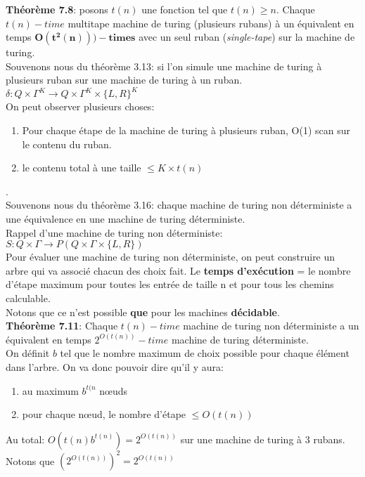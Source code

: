 \documentclass[a4paper,12pt]{article}
\begin{document}
  \textbf{Théorème 7.8}: posons $t(n)$ une fonction tel que $t(n) \geq n$.  Chaque $t(n)-time$ multitape machine de turing (plusieurs rubans) à un équivalent en temps $\mathbf{O(t^2(n)))-times}$ avec un seul ruban (\textit{single-tape}) sur la machine de turing.\\
  Souvenons nous du théorème 3.13: si l'on simule une machine de turing à plusieurs ruban sur une machine de turing à un ruban.  $\delta : Q \times \Gamma^K \rightarrow Q \times \Gamma^K \times \{L, R\}^K$\\
  On peut observer plusieurs choses:
  \begin{enumerate}
   \item Pour chaque étape de la machine de turing à plusieurs ruban, O(1) scan sur le contenu du ruban.
   \item le contenu total à une taille $\leq K \times t(n)$
  \end{enumerate}
  .\\
  
  Souvenons nous du théorème 3.16: chaque machine de turing non déterministe a une équivalence en une machine de turing déterministe.\\
  Rappel d'une machine de turing non déterministe: $S:Q \times \Gamma \rightarrow P(Q \times \Gamma \times \{L, R\})$\\
  Pour évaluer une machine de turing non déterministe, on peut construire un arbre qui va associé chacun des choix fait.  Le \textbf{temps d'exécution} = le nombre d'étape maximum pour toutes les entrée de taille n et pour tous les chemins calculable.\\
  Notons que ce n'est possible \textbf{que} pour les machines \textbf{décidable}.\\
  \textbf{Théorème 7.11}: Chaque $t(n)-time$ machine de turing non déterministe a un équivalent en temps $2^{O(t(n))}-time$ machine de turing déterministe.\\
  On définit $b$ tel que le nombre maximum de choix possible pour chaque élément dans l'arbre.  On va donc pouvoir dire qu'il y aura:
  \begin{enumerate}
   \item au maximum $b^{t(n}$ nœuds
   \item pour chaque nœud, le nombre d'étape $\leq O(t(n))$
  \end{enumerate}
  Au total: $O(t(n) b^{t(n)}) = 2^{O(t(n))}$ sur une machine de turing à 3 rubans.\\
  Notons que $(2^{O(t(n))})^2 = 2^{O(t(n))}$\\
\end{document}
